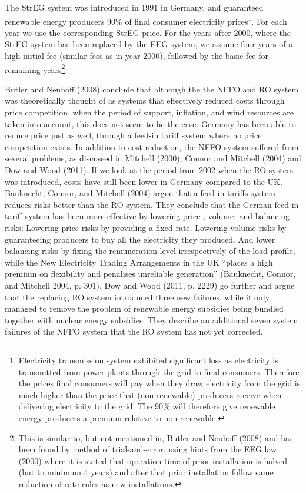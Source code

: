 \documentclass[a4paper, 12pt]{article}
\begin{document}
The StrEG system was introduced in 1991 in Germany, and guaranteed renewable energy producers 90\% of final consumer electricity prices\footnote{Electricity transmission system exhibited significant loss as electricity is transmitted from power plants through the grid to final consumers. Therefore the prices final consumers will pay when they draw electricity from the grid is much higher than the price that (non-renewable) producers receive when delivering electricity to the grid. The 90\% will therefore give renewable energy producers a premium relative to non-renewable.}. For each year we use the corresponding StrEG price. For the years after 2000, where the StrEG system has been replaced by the EEG system, we assume four years of a high initial fee (similar fees as in year 2000), followed by the basic fee for remaining years\footnote{This is similar to, but not mentioned in, Butler and Neuhoff (2008) and has been found by method of trial-and-error, using hints from the EEG law (2000) where it is stated that operation time of prior installation is halved (but to minimum 4 years) and after that prior installation follow same reduction of rate rules as new installations.}.

Butler and Neuhoff (2008) conclude that although the the NFFO and RO system was theoretically thought of as systems that effectively reduced costs through price competition, when the period of support, inflation, and wind resources are taken into account, this does not seem to be the case. Germany has been able to reduce price just as well, through a feed-in tariff system where no price competition exists. In addition to cost reduction, the NFFO system suffered from several problems, as discussed in Mitchell (2000), Connor and Mitchell (2004) and Dow and Wood (2011). If we look at the period from 2002 when the RO system was introduced, costs have still been lower in Germany compared to the UK. Bauknecht, Connor, and Mitchell (2004) argue that a feed-in tariffs system reduces risks better than the RO system. They conclude that the German feed-in tariff system has been more effective by lowering price-, volume- and balancing-risks; Lowering price risks by providing a fixed rate. Lowering volume risks by guaranteeing producers to buy all the electricity they produced. And lower balancing risks by fixing the remuneration level irrespectively of the load profile, while the New Electricity Trading Arrangements in the UK ``places a high premium on flexibility and penalises unreliable generation'' (Bauknecht, Connor, and Mitchell 2004, p. 301). Dow and Wood (2011, p. 2229) go further and argue that the replacing RO system introduced three new failures, while it only managed to remove the problem of renewable energy subsidies being bundled together with nuclear energy subsidies. They describe an additional seven system failures of the NFFO system that the RO system has not yet corrected.
\end{document}
